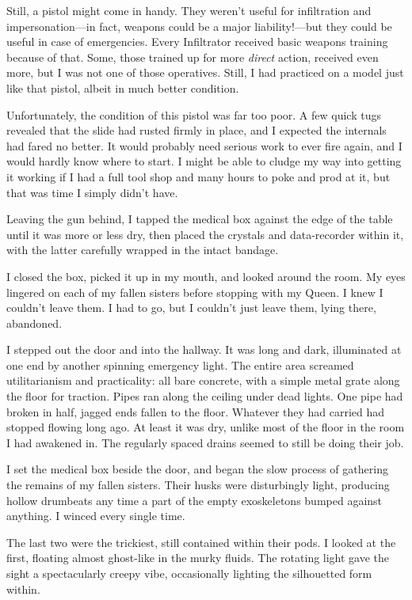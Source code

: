 Still, a pistol might come in handy. They weren’t useful for infiltration and impersonation—in fact, weapons could be a major liability!—but they could be useful in case of emergencies. Every Infiltrator received basic weapons training because of that. Some, those trained up for more \textit{direct} action, received even more, but I was not one of those operatives. Still, I had practiced on a model just like that pistol, albeit in much better condition.

Unfortunately, the condition of this pistol was far too poor. A few quick tugs revealed that the slide had rusted firmly in place, and I expected the internals had fared no better. It would probably need serious work to ever fire again, and I would hardly know where to start. I might be able to cludge my way into getting it working if I had a full tool shop and many hours to poke and prod at it, but that was time I simply didn’t have.

Leaving the gun behind, I tapped the medical box against the edge of the table until it was more or less dry, then placed the crystals and data-recorder within it, with the latter carefully wrapped in the intact bandage.

I closed the box, picked it up in my mouth, and looked around the room. My eyes lingered on each of my fallen sisters before stopping with my Queen. I knew I couldn’t leave them. I had to go, but I couldn’t just leave them, lying there, abandoned.

I stepped out the door and into the hallway. It was long and dark, illuminated at one end by another spinning emergency light. The entire area screamed utilitarianism and practicality: all bare concrete, with a simple metal grate along the floor for traction. Pipes ran along the ceiling under dead lights. One pipe had broken in half, jagged ends fallen to the floor. Whatever they had carried had stopped flowing long ago. At least it was dry, unlike most of the floor in the room I had awakened in. The regularly spaced drains seemed to still be doing their job.

I set the medical box beside the door, and began the slow process of gathering the remains of my fallen sisters. Their husks were disturbingly light, producing hollow drumbeats any time a part of the empty exoskeletons bumped against anything. I winced every single time.

The last two were the trickiest, still contained within their pods. I looked at the first, floating almost ghost-like in the murky fluids. The rotating light gave the sight a spectacularly creepy vibe, occasionally lighting the silhouetted form within.

